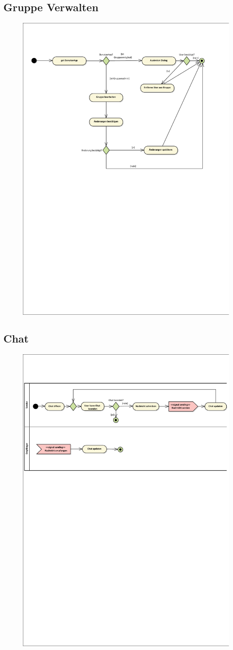 \subsection*{Gruppe Verwalten}
\begin{figure}[h!]
	\centering
	\includegraphics[width=0.8\linewidth]{docs/3_Aktivitaetsdiagramme/Richard/gruppe_verwalten.pdf}
	\label{fig:ActDia_Gruppe_Verwalten}
\end{figure}

\vfill

\subsection*{Chat}
\begin{figure}[h!]
	\centering
	\includegraphics[width=0.8\linewidth]{docs/3_Aktivitaetsdiagramme/Richard/chat.pdf}
	\label{fig:ActDia_Chat}
\end{figure}

